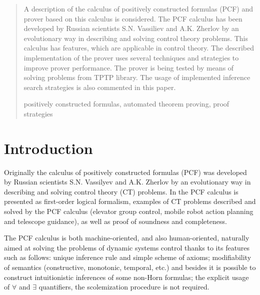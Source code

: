 \documentclass[runningheads,a4paper]{llncs}
\newcommand{\keywords}[1]{\par\addvspace\baselineskip
\noindent\keywordname\enspace\ignorespaces#1}
\begin{document}
\begin{abstract}
A description of the calculus of positively constructed formulas (PCF) and prover based on this calculus is considered. The PCF calculus has been developed by Russian scientists S.N. Vassiliev and A.K. Zherlov by an evolutionary way in describing and solving control theory problems. This calculus has features, which are applicable in control theory. The described implementation of the prover uses several techniques and strategies to improve prover performance. The prover is being tested by means of solving problems from TPTP library. The usage of implemented inference search strategies is also commented in this paper.
\keywords{positively constructed formulas, automated theorem proving, proof strategies}
\end{abstract}



\section{Introduction}

Originally \cite{SNV1990,ICDS2000} the calculus of positively constructed formulas (PCF) was developed by Russian scientists S.N. Vassilyev and A.K. Zherlov by an evolutionary way in describing and solving control theory (CT) problems. In \cite{ICDS2000} the PCF calculus is presented as first-order logical formalism, examples of CT problems described and solved by the PCF calculus (elevator group control, mobile robot action planning and telescope guidance), as well as proof of soundness and completeness.

The PCF calculus is both machine-oriented, and also human-oriented, naturally aimed at solving the problems of dynamic systems control thanks to its features such as follows: unique inference rule and simple scheme of axioms; modifiability of semantics (constructive, monotonic, temporal, etc.) and besides it is possible to construct intuitionistic inferences of some non-Horn formulas; the explicit usage of $\forall$ and $\exists$ quantifiers, the scolemization procedure is not required.
\end{document}
